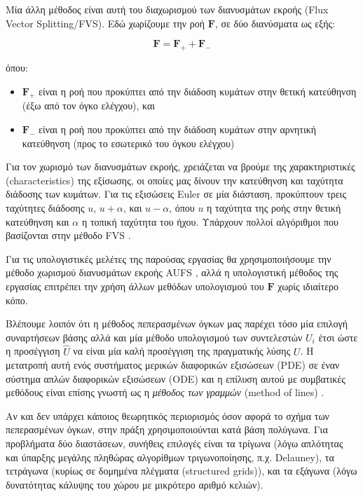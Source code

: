 Μία άλλη μέθοδος είναι αυτή του διαχωρισμού των διανυσμάτων εκροής (Flux Vector Splitting/FVS).
Εδώ χωρίζουμε την ροή $\mathbf{F}$, σε δύο διανύσματα ως εξής:

\begin{equation}
    \mathbf{F} = \mathbf{F}_{+} + \mathbf{F}_{-}
\end{equation}

όπου:
\begin{itemize}
    \item $\mathbf{F}_{+}$ είναι η ροή που προκύπτει από την διάδοση κυμάτων στην θετική κατεύθηνση (έξω από τον όγκο ελέγχου), και
    \item $\mathbf{F}_{-}$ είναι η ροή που προκύπτει από την διάδοση κυμάτων στην αρνητική κατεύθηνση (προς το εσωτερικό του όγκου ελέγχου)
\end{itemize}

Για τον χωρισμό των διανυσμάτων εκροής, χρειάζεται να βρούμε της χαρακτηριστικές (characteristics) της εξίσωσης, οι οποίες μας δίνουν την κατεύθηνση και ταχύτητα διάδοσης των κυμάτων.
Για τις εξισώσεις Euler σε μία διάσταση, προκύπτουν τρεις ταχύτητες διάδοσης $u$, $u + \alpha$, και $u - \alpha$, όπου $u$ η ταχύτητα της ροής στην θετική κατεύθηνση και $\alpha$ η τοπική ταχύτητα του ήχου.
Υπάρχουν πολλοί αλγόριθμοι που βασίζονται στην μέθοδο FVS \cite{Toro2012}.

Για τις υπολογιστικές μελέτες της παρούσας εργασίας θα χρησιμοποιήσουμε την μέθοδο χωρισμού διανυσμάτων εκροής AUFS \cite{Sun2003}, αλλά η υπολογιστική μέθοδος της εργασίας επιτρέπει την χρήση άλλων μεθόδων υπολογισμού του $\mathbf{F}$ χωρίς ιδιαίτερο κόπο.

Βλέπουμε λοιπόν ότι η μέθοδος πεπερασμένων όγκων μας παρέχει τόσο μία επιλογή συναρτήσεων βάσης αλλά και μία μέθοδο υπολογισμού των συντελεστών $U_i$ έτσι ώστε η προσέγγιση $\hat{U}$ να είναι μία καλή προσέγγιση της πραγματικής λύσης $U$.
Η μετατροπή αυτή ενός συστήματος μερικών διαφορικών εξισώσεων (PDE) σε έναν σύστημα απλών διαφορικών εξισώσεων (ODE) και η επίλυση αυτού με συμβατικές μεθόδους είναι επίσης γνωστή ως η \emph{μέθοδος των γραμμών} (method of lines) \cite[p. ~352]{Solomon2015}.

Αν και δεν υπάρχει κάποιος θεωρητικός περιορισμός όσον αφορά το σχήμα των πεπερασμένων όγκων, στην πράξη χρησιμοποιούνται κατά βάση πολύγωνα.
Για προβλήματα δύο διαστάσεων, συνήθεις επιλογές είναι τα τρίγωνα (λόγω απλότητας και ύπαρξης μεγάλης πληθώρας αλγορίθμων τριγωνοποίησης, π.χ. Delauney), τα τετράγωνα (κυρίως σε δομημένα πλέγματα (structured grids)), και τα εξάγωνα (λόγω δυνατότητας κάλυψης του χώρου με μικρότερο αριθμό κελιών).

